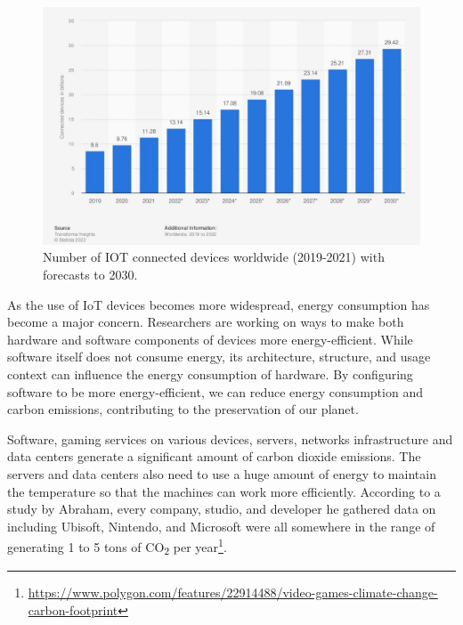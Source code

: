 \vspace{-12pt}
\vspace{3em}
\begin{figure}[h]
  \centering
  \includegraphics[width=.7\textwidth]{img/Number-of-iot-connected-devices-worldwide-2019-2021-with-forecasts-to-2030.jpg}
  \caption{Number of IOT connected devices worldwide (2019-2021) with forecasts to 2030.\protect\footnotemark}
  \label{fig:Number-of-iot-connected-devices-worldwide-2019-2021-with-forecasts-to-2030.jpg}
\end{figure}
\vspace{-15pt}

As the use of IoT devices becomes more widespread, energy consumption has become a major concern. Researchers are working on ways to make both hardware and software components of devices more energy-efficient. While software itself does not consume energy, its architecture, structure, and usage context can influence the energy consumption of hardware. By configuring software to be more energy-efficient, we can reduce energy consumption and carbon emissions, contributing to the preservation of our planet.\par




\vspace{.5em}
Software, gaming services on various devices, servers, networks infrastructure and data centers generate a significant amount of carbon dioxide emissions. The servers and data centers also need to use a huge amount of energy to maintain the temperature so that the machines can work more efficiently. According to a study by Abraham, every company, studio, and developer he gathered data on including Ubisoft, Nintendo, and Microsoft were all somewhere in the range of generating 1 to 5 tons of CO\textsubscript{2} per year\footnote{\url{https://www.polygon.com/features/22914488/video-games-climate-change-carbon-footprint}}. 

